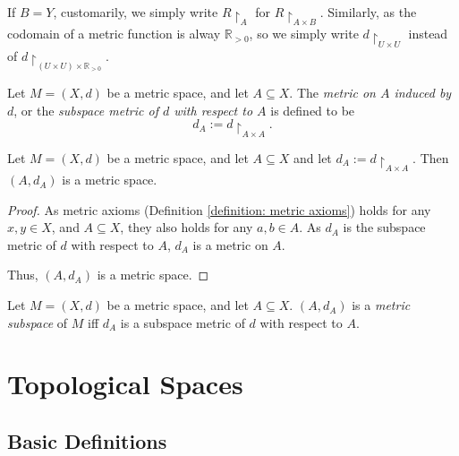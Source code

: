 If $B = Y$, customarily, we simply write $R \restriction_{A}$ for $R \restriction_{A \times B}$. Similarly, as the codomain of a metric function is alway $\mathbb R_{> 0}$, so we simply write $d \restriction_{U \times U}$ instead of $d \restriction_{(U \times U) \times \mathbb R_{> 0}}$.


\begin{definition}
	\label{definition: subspace metric}
	Let $M = (X, d)$ be a metric space, and let $A \subseteq X$. The \textit{metric on $A$ induced by $d$}, or the \textit{subspace metric of $d$ with respect to $A$} is defined to be
	$$
	d_A := d\restriction_{A \times A}.
	$$
\end{definition}


\begin{theorem}
	Let $M = (X, d)$ be a metric space, and let $A \subseteq X$ and let $d_A := d\restriction_{A \times A}$. Then $(A, d_A)$ is a metric space.
	
	\begin{proof}		
		As metric axioms (Definition \ref{definition: metric axioms}) holds for any $x,y \in X$, and $A \subseteq X$, they also holds for any $a, b \in A$. As $d_A$ is the subspace metric of $d$ with respect to $A$, $d_A$ is a metric on $A$.
		
		Thus, $(A, d_A)$ is a metric space.
	\end{proof}
\end{theorem}


\begin{definition}
	\label{definition: metric subspace}
	Let $M = (X, d)$ be a metric space, and let $A \subseteq X$. $(A, d_A)$ is a \textit{metric subspace} of $M$ iff $d_A$ is a subspace metric of $d$ with respect to $A$.
\end{definition}



\chapter{Topological Spaces}


\section{Basic Definitions}


